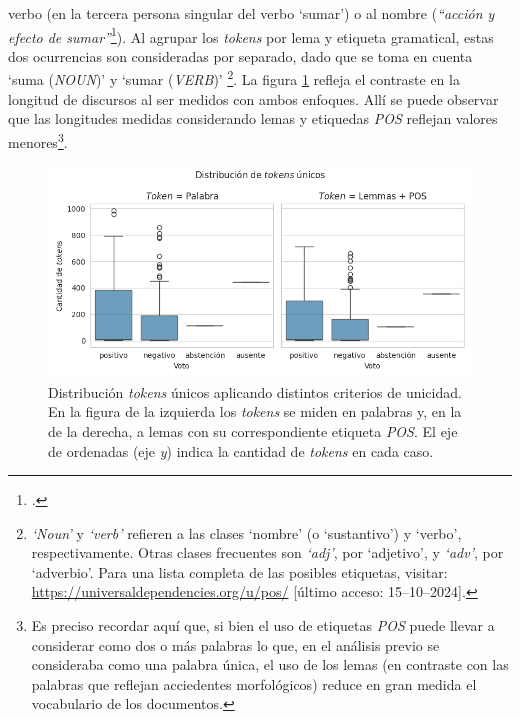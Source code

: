 verbo (en la tercera persona singular del verbo `sumar') o al nombre
(\textit{``acci\'on y efecto de sumar''}\footnote{.}). Al
agrupar los \textit{tokens} por lema y etiqueta gramatical, estas dos
ocurrencias son consideradas por separado, dado que se toma en cuenta
`suma (\textit{NOUN})' y `sumar (\textit{VERB})'
\footnote{\textit{`Noun'} y \textit{`verb'} refieren a las clases `nombre'
(o `sustantivo') y `verbo', respectivamente. Otras clases frecuentes son \textit{`adj'},
por `adjetivo', y \textit{`adv'}, por `adverbio'. Para una lista completa
de las posibles etiquetas, visitar: \url{https://universaldependencies.org/u/pos/}
[\'ultimo acceso: 15--10--2024].}. La figura \ref{fig-distrib-unique-tokens} refleja el contraste
en la longitud de discursos al ser medidos con ambos enfoques.
All\'i se puede observar que las longitudes medidas considerando lemas y etiquedas
\textit{POS} reflejan valores menores\footnote{Es preciso recordar aqu\'i
que, si bien el uso de etiquetas \textit{POS} puede llevar a considerar
como dos o m\'as palabras lo que, en el an\'alisis previo se consideraba
como una palabra \'unica, el uso de los lemas (en contraste con
las palabras que reflejan acciedentes morfol\'ogicos) reduce en gran
medida el vocabulario de los documentos.}.

\begin{figure}[h!]
\centering
\includegraphics[scale=0.45]{./images/graphs/distrib_tokens_vs_lemma_pos.png}
\caption{Distribuci\'on \textit{tokens} \'unicos aplicando distintos criterios de unicidad.
En la figura de la izquierda los \textit{tokens} se miden en palabras y, en la de la
derecha, a lemas con su correspondiente etiqueta \textit{POS}. El eje de ordenadas
(eje \textit{y}) indica la cantidad de \textit{tokens} en cada caso.}
\label{fig-distrib-unique-tokens}
\end{figure}